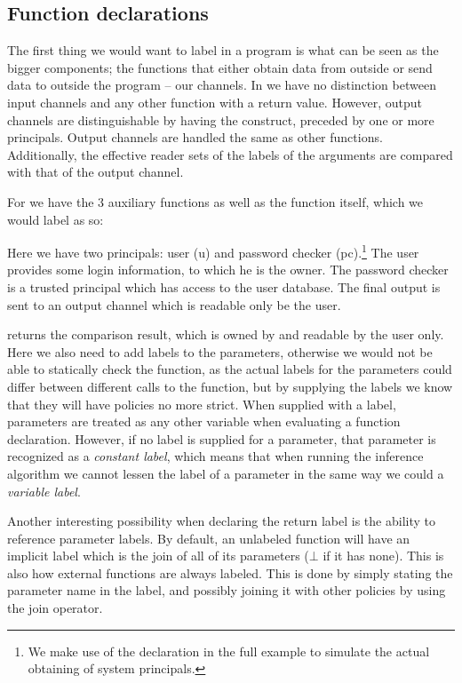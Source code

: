\subsection{Function declarations}
The first thing we would want to label in a program is what can be seen as the bigger components; the functions that either obtain data from outside or send data to outside the program -- our channels.
In \thelang{} we have no distinction between input channels and any other function with a return value.
However, output channels are distinguishable by having the \dlmc{<-} construct, preceded by one or more principals.
Output channels are handled the same as other functions.
Additionally, the effective reader sets of the labels of the arguments are compared with that of the output channel.

For  we have the 3 auxiliary functions as well as the  function itself, which we would label as so:\\
\begin{minipage}{\linewidth}

\end{minipage}

Here we have two principals: user (u) and password checker (pc).\footnote{We make use of the  declaration in the full example to simulate the actual obtaining of system principals.}
The user provides some login information, to which he is the owner.
The password checker is a trusted principal which has access to the user database.
The final output is sent to an output channel which is readable only be the user.

 returns the comparison result, which is owned by and readable by the user only.
Here we also need to add labels to the parameters, otherwise we would not be able to statically check the function, as the actual labels for the parameters could differ between different calls to the function, but by supplying the labels we know that they will have policies no more strict.
When supplied with a label, parameters are treated as any other variable when evaluating a function declaration.
However, if no label is supplied for a parameter, that parameter is recognized as a \emph{constant label}, which means that when running the inference algorithm we cannot lessen the label of a parameter in the same way we could a \emph{variable label}.

Another interesting possibility when declaring the return label is the ability to reference parameter labels.
By default, an unlabeled function will have an implicit label which is the join of all of its parameters ($\bot$ if it has none).
This is also how external functions are always labeled.
This is done by simply stating the parameter name in the label, and possibly joining it with other policies by using the join operator.

